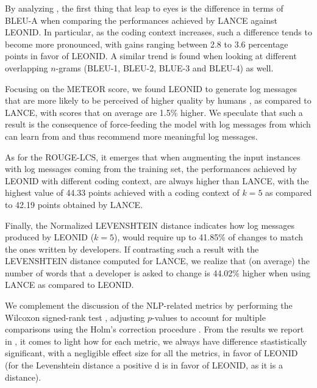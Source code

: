By analyzing , the first thing that leap to eyes is the difference in terms of BLEU-A when comparing the performances achieved by LANCE against LEONID. In particular, as the coding context increases, such a difference tends to become more pronounced, with gains ranging between 2.8 to 3.6 percentage points in favor of LEONID. A similar trend is found when looking at different overlapping $n$-grams (\ie BLEU-1, BLEU-2, BLUE-3 and BLEU-4) as well. 

Focusing on the METEOR score, we found LEONID to generate log messages that are more likely to be perceived of higher quality by humans \cite{meteor}, as compared to LANCE, with scores that on average are 1.5\% higher. We speculate that such a result is the consequence of force-feeding the model with log messages from which can learn from and thus recommend more meaningful log messages.

As for the ROUGE-LCS, it emerges that when augmenting the input instances with log messages coming from the training set, the performances achieved by LEONID with different coding context, are always higher than LANCE, with the highest value of 44.33 points achieved with a coding context of $k=5$ as compared to 42.19 points obtained by LANCE.

Finally, the Normalized LEVENSHTEIN distance indicates how log messages produced by LEONID ($k=5$), would require up to 41.85\% of changes to match the ones written by developers. If contrasting such a result with the LEVENSHTEIN distance computed for LANCE, we realize that (on average) the number of words that a developer is asked to change is 44.02\% higher when using LANCE as compared to LEONID.

We complement the discussion of the NLP-related metrics by performing the Wilcoxon signed-rank test \cite{wilcoxon}, adjusting $p$-values to account for multiple comparisons using the Holm's correction procedure \cite{Holm1979a}. 
From the results we report in , it comes to light how for each metric, we always have difference stastistically significant, with a negligible effect size for all the metrics, in favor of LEONID (for the Levenshtein distance a positive d is in favor of LEONID, as it is a distance). 





